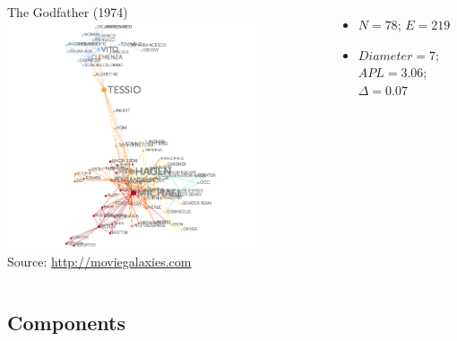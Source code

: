 \documentclass[8pt]{beamer}
\begin{document}
\begin{frame}[fragile]
\begin{columns}[c]
\begin{minipage}[c][.5\textheight][c]{\linewidth}
\medskip
\centering
\footnotesize The Godfather (1974)
\includegraphics[width = 0.8\textwidth, keepaspectratio]{gf2}\\
\tiny Source: \url{http://moviegalaxies.com}

\footnotesize
\begin{itemize}
\item $N = 78$; $E = 219$
\item $Diameter = 7$; $APL = 3.06$; $\Delta = 0.07$
\end{itemize}


\end{minipage}	 

\end{columns}

\end{frame}


\subsection{Components}
\end{document}
